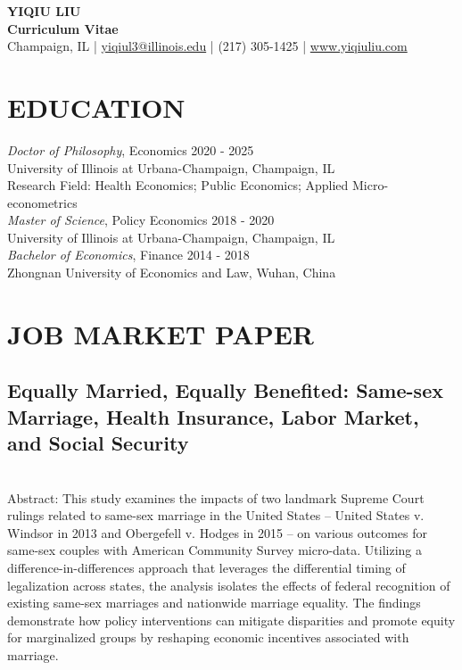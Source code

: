 \documentclass[a4paper,9pt]{extarticle}
\begin{document}
\pagestyle{empty}

\begin{center}
\textbf{\Large YIQIU LIU }\\[3pt] %
\textbf{Curriculum Vitae}\\[1pt] %
Champaign, IL | \href{mailto:yiqiul3@illinois.edu}{yiqiul3@illinois.edu} | (217) 305-1425 | \href{www.yiqiuliu.com}{www.yiqiuliu.com} %
\end{center}


\section*{EDUCATION}

\noindent
{\sl Doctor of Philosophy}, 
Economics \hfill  2020 - 2025 \\ 
University of Illinois at Urbana-Champaign, Champaign, IL \\ 
Research Field: Health Economics; Public Economics; Applied Micro-econometrics
\\

\noindent
{\sl Master of Science}, 
Policy Economics \hfill  2018 - 2020  \\ 
University of Illinois at Urbana-Champaign, Champaign, IL \\ 

\noindent
{\sl Bachelor of Economics}, 
Finance \hfill  2014 - 2018 \\ 
Zhongnan University of Economics and Law, Wuhan, China  \\ 

\section*{JOB MARKET PAPER}

\subsection*{Equally Married, Equally Benefited: Same-sex Marriage, Health Insurance, Labor Market, and Social Security} 
\\ 

Abstract: This study examines the impacts of two landmark Supreme Court rulings related to same-sex marriage in the United States – United States v. Windsor in 2013 and Obergefell v. Hodges in 2015 – on various outcomes for same-sex couples with American Community Survey micro-data. Utilizing a difference-in-differences approach that leverages the differential timing of legalization across states, the analysis isolates the effects of federal recognition of existing same-sex marriages and nationwide marriage equality. The findings demonstrate how policy interventions can mitigate disparities and promote equity for marginalized groups by reshaping economic incentives associated with marriage.
\end{document}

